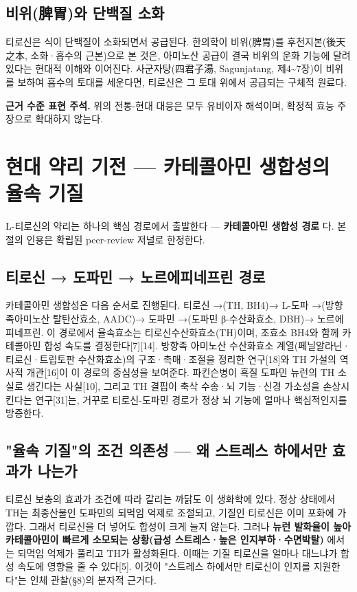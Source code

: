 \documentclass[12pt,oneside]{book}
\newenvironment{authnote}
  {\par\smallskip\begingroup\leftskip=6mm\rightskip=3mm\small\color{muted}\noindent\ignorespaces}
  {\par\endgroup\smallskip}
\begin{document}
\subsection{비위(脾胃)와 단백질 소화}

티로신은 식이 단백질이 소화되면서 공급된다. 한의학이 비위(脾胃)를 후천지본(後天之本, 소화·흡수의 근본)으로 본 것은, 아미노산 공급이 결국 비위의 운화 기능에 달려 있다는 현대적 이해와 이어진다. 사군자탕(四君子湯, Sagunjatang, 제4\textasciitilde{}7장)이 비위를 보하여 흡수의 토대를 세운다면, 티로신은 그 토대 위에서 공급되는 구체적 원료다.

\begin{authnote}\textbf{근거 수준 표현 주석.} 위의 전통-현대 대응은 모두 유비이자 해석이며, 확정적 효능 주장으로 확대하지 않는다.\end{authnote}

\section{현대 약리 기전 — 카테콜아민 생합성의 율속 기질}

L-티로신의 약리는 하나의 핵심 경로에서 출발한다 — \textbf{카테콜아민 생합성 경로} 다. 본 절의 인용은 확립된 peer-review 저널로 한정한다.

\subsection{티로신 → 도파민 → 노르에피네프린 경로}

카테콜아민 생합성은 다음 순서로 진행된다. 티로신 →(TH, BH4)→ L-도파 →(방향족아미노산 탈탄산효소, AADC)→ 도파민 →(도파민 β-수산화효소, DBH)→ 노르에피네프린. 이 경로에서 율속효소는 티로신수산화효소(TH)이며, 조효소 BH4와 함께 카테콜아민 합성 속도를 결정한다[7][14]. 방향족 아미노산 수산화효소 계열(페닐알라닌·티로신·트립토판 수산화효소)의 구조·촉매·조절을 정리한 연구[18]와 TH 가설의 역사적 개관[16]이 이 경로의 중심성을 보여준다. 파킨슨병이 흑질 도파민 뉴런의 TH 소실로 생긴다는 사실[10], 그리고 TH 결핍이 축삭 수송·뇌 기능·신경 가소성을 손상시킨다는 연구[31]는, 거꾸로 티로신-도파민 경로가 정상 뇌 기능에 얼마나 핵심적인지를 방증한다.

\subsection{"율속 기질"의 조건 의존성 — 왜 스트레스 하에서만 효과가 나는가}

티로신 보충의 효과가 조건에 따라 갈리는 까닭도 이 생화학에 있다. 정상 상태에서 TH는 최종산물인 도파민의 되먹임 억제로 조절되고, 기질인 티로신은 이미 포화에 가깝다. 그래서 티로신을 더 넣어도 합성이 크게 늘지 않는다. 그러나 \textbf{뉴런 발화율이 높아 카테콜아민이 빠르게 소모되는 상황(급성 스트레스·높은 인지부하·수면박탈)} 에서는 되먹임 억제가 풀리고 TH가 활성화된다. 이때는 기질 티로신을 얼마나 대느냐가 합성 속도에 영향을 줄 수 있다[5]. 이것이 "스트레스 하에서만 티로신이 인지를 지원한다"는 인체 관찰(§8)의 분자적 근거다.
\end{document}
